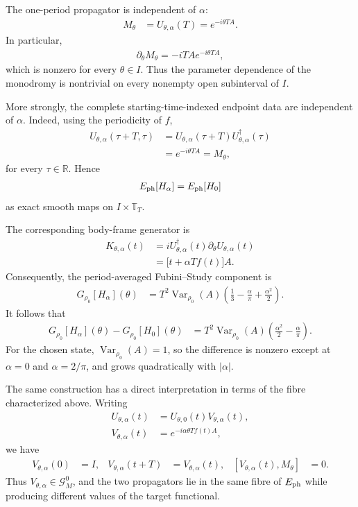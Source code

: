 \documentclass[twocolumn,prl,aps,floatfix]{revtex4-2}
\begin{document}
The one-period propagator is independent of $\alpha$:
\begin{align}
M_\theta
&=
U_{\theta,\alpha}(T)
=
e^{-i\theta T A}.
\label{eq:witness_monodromy}
\end{align}
In particular,
\begin{align}
\partial_\theta M_\theta
=
-iTAe^{-i\theta TA},
\end{align}
which is nonzero for every $\theta\in I$. Thus the parameter dependence of the monodromy is nontrivial on every nonempty open subinterval of $I$.

More strongly, the complete starting-time-indexed endpoint data are independent of $\alpha$. Indeed, using the periodicity of $f$,
\begin{align}
U_{\theta,\alpha}(\tau+T,\tau)
&=
U_{\theta,\alpha}(\tau+T)
U_{\theta,\alpha}^\dagger(\tau)
\nonumber\\
&=
e^{-i\theta T A}
=
M_\theta ,
\label{eq:witness_endpoint}
\end{align}
for every $\tau\in\mathbb R$. Hence
\begin{align}
E_{\rm ph}[H_\alpha]
=
E_{\rm ph}[H_0]
\end{align}
as exact smooth maps on $I\times\mathbb T_T$.

The corresponding body-frame generator is
\begin{align}
K_{\theta,\alpha}(t)
&=
iU_{\theta,\alpha}^\dagger(t)
\partial_\theta U_{\theta,\alpha}(t)
\nonumber\\
&=
\bigl[t+\alpha T f(t)\bigr]A .
\label{eq:witness_generator}
\end{align}
Consequently, the period-averaged Fubini--Study component is
\begin{align}
G_{\rho_0}[H_\alpha](\theta)
&=
T^2\operatorname{Var}_{\rho_0}(A)
\left(
\frac{1}{3}-\frac{\alpha}{\pi}
+\frac{\alpha^2}{2}
\right).
\label{eq:witness_metric}
\end{align}
It follows that
\begin{align}
G_{\rho_0}[H_\alpha](\theta)
-
G_{\rho_0}[H_0](\theta)
&=
T^2\operatorname{Var}_{\rho_0}(A)
\left(
\frac{\alpha^2}{2}-\frac{\alpha}{\pi}
\right).
\label{eq:witness_difference}
\end{align}
For the chosen state, $\operatorname{Var}_{\rho_0}(A)=1$, so the difference is nonzero except at $\alpha=0$ and $\alpha=2/\pi$, and grows quadratically with $|\alpha|$.

The same construction has a direct interpretation in terms of the fibre characterized above. Writing
\begin{align}
U_{\theta,\alpha}(t)
&=
U_{\theta,0}(t)V_{\theta,\alpha}(t),
\nonumber\\
V_{\theta,\alpha}(t)
&=
e^{-i\alpha\theta T f(t)A},
\end{align}
we have
\begin{align}
V_{\theta,\alpha}(0)
&=I,
&
V_{\theta,\alpha}(t+T)
&=V_{\theta,\alpha}(t),
&
[V_{\theta,\alpha}(t),M_\theta]
&=0.
\end{align}
Thus $V_{\theta,\alpha}\in\mathcal G_M^0$, and the two propagators lie in the same fibre of $E_{\rm ph}$ while producing different values of the target functional.
\end{document}
